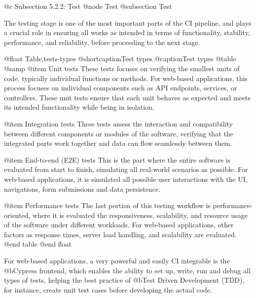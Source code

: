 @c Subsection 5.2.2: Test
@node Test
@subsection Test

The testing stage is one of the most important parts of the CI pipeline, and plays a crucial role in ensuring all works as intended in terms of functionality, stability, performance, and reliability, before proceeding to the next stage.

@float Table,tests-types
@shortcaption{Test types}
@caption{Test types}
@table @samp
@item Unit tests
These tests focuses on verifying the smallest units of code, typically individual functions or methods. For web-based applications, this process focuses on individual components such as API endpoints, services, or controllers. These unit tests ensure that each unit behaves as expected and meets its intended functionality while being in isolation.

@item Integration tests
These tests assess the interaction and compatibility between different components or modules of the software, verifying that the integrated parts work together and data can flow seamlessly between them.

@item End-to-end (E2E) tests
This is the part where the entire software is evaluated from start to finish, simulating all real-world scenarios as possible. For web-based applications, it is simulated all possible user interactions with the UI, navigations, form submissions and data persistence.

@item Performance tests
The last portion of this testing workflow is performance-oriented, where it is evaluated the responsiveness, scalability, and resource usage of the software under different workloads. For web-based applications, other factors as response times, server load handling, and scalability are evaluated.
@end table
@end float

For web-based applications, a very powerful and easily CI integrable is the @b{Cypress} frontend, which enables the ability to set up, write, run and debug all types of tests, helping the best practice of @b{Test Driven Development (TDD)}, for instance, create unit test cases before developing the actual code.
